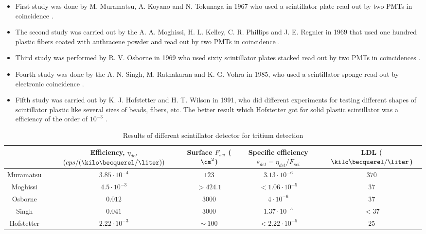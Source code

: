 \begin{itemize}

\item{} First study was done by M. Muramatsu, A. Koyano and N. Tokunaga in 1967 who used a scintillator plate read out by two PMTs in coincidence \cite{Muramatsu}.

\item{} The second study was carried out by the A. A. Moghissi, H. L. Kelley, C. R. Phillips and J. E. Regnier in 1969 that used one hundred plastic fibers coated with anthracene powder and read out by two PMTs in coincidence \cite{Moghissi}.

\item{} Third study was performed by R. V. Osborne in 1969 who used sixty scintillator plates stacked read out by two PMTs in coincidences \cite{Osborne}.

\item{} Fourth study was done by the A. N. Singh, M. Ratnakaran and K. G. Vohra in 1985, who used a scintillator sponge read out by electronic coincidence \cite{Ratnakaran}\cite{Ratnakaran2000}.

\item{} Fifth study was carried out by K. J. Hofstetter and H. T. Wilson in 1991, who did different experiments for testing different shapes of scintillator plastic like several sizes of beads, fibers, etc. The better result which Hofstetter got for solid plastic scintillator was a efficiency of the order of $10^{-3}$ \cite{Hofstetter1}\cite{Hofstetter2}.

\end{itemize}

\begin{table}[htbp]
\begin{center}
\begin{tabular}{|c|c|c|c|c|}
\hline
 & \parbox{6em}{\centering Efficiency, $\eta_{det}$\\ $(cps/(\kilo\becquerel/\liter))$}  & \parbox{5em}{\centering Surface\\ $F_{sci}$ ($\cm^2$)}  & \parbox{5em}{\centering Specific efficiency\\ $\varepsilon_{det}=\eta_{det}/F_{sci}$} & LDL ($\kilo\becquerel/\liter$)\\
\hline \hline \hline
Muramatsu & $3.85 \cdot 10^{-4}$ & $123$ & $3.13 \cdot 10^{-6}$ & $370$ \\ \hline
Moghissi & $4.5 \cdot 10^{-3}$ & $>424.1$ & $<1.06 \cdot 10^{-5}$ & $37$ \\ \hline
Osborne & $0.012$ & $3000$ & $4 \cdot 10^{-6}$ & $37$ \\ \hline
Singh & $0.041$ & $3000$ & $1.37 \cdot 10^{-5}$ & $<37$ \\ \hline
Hofstetter & $2.22 \cdot 10^{-3}$ & $\sim~100$ & $<2.22 \cdot 10^{-5}$ & $25$ \\ \hline
\end{tabular}
\caption{Results of different scintillator detector for tritium detection}
\label{tab:PlasticScinTritium}
\end{center}
\end{table}

